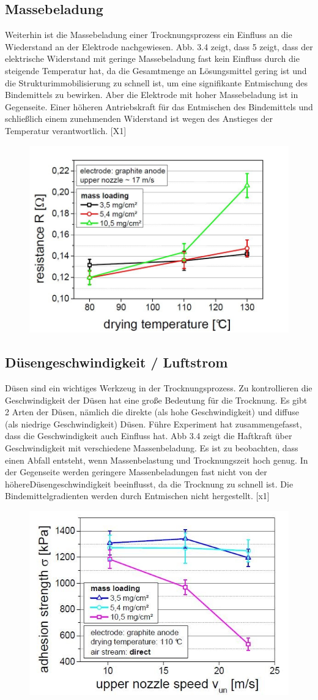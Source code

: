 \documentclass[12pt,UTF8]{article}
\begin{document}
\subsection{Massebeladung}
Weiterhin ist die Massebeladung einer Trocknungsprozess ein Einfluss an die Wiederstand an der Elektrode nachgewiesen. Abb. 3.4 zeigt, dass 5 zeigt, dass der elektrische Widerstand mit geringe Massebeladung fast kein Einfluss durch die steigende Temperatur hat, da die Gesamtmenge an Lösungsmittel gering ist und die Strukturimmobilisierung zu schnell ist, um eine signifikante Entmischung des Bindemittels zu bewirken. Aber die Elektrode mit hoher Massebeladung ist in Gegenseite. Einer höheren Antriebskraft für das Entmischen des Bindemittels und schließlich einem zunehmenden Widerstand ist wegen des Anstieges der Temperatur verantwortlich. [X1]
\begin{figure}[H]
    \centering
    \includegraphics[width=.5\linewidth]{Diagramme/fig3_2_3.jpg}
    \caption{}
\end{figure}

\subsection{D\"usengeschwindigkeit / Luftstrom}
Düsen sind ein wichtiges Werkzeug in der Trocknungsprozess. Zu kontrollieren die Geschwindigkeit der Düsen hat eine große Bedeutung für die Trocknung. Es gibt 2 Arten der Düsen, nämlich die direkte (als hohe Geschwindigkeit) und diffuse (als niedrige Geschwindigkeit) Düsen. Führe Experiment hat zusammengefasst, dass die Geschwindigkeit auch Einfluss hat.
Abb 3.4 zeigt die Haftkraft über Geschwindigkeit mit verschiedene Massenbeladung. Es ist zu beobachten, dass einen Abfall entsteht, wenn Massenbelastung und Trocknungszeit hoch genug. In der Gegenseite werden geringere Massenbeladungen fast nicht von der höhere\linebreak Düsengeschwindigkeit beeinflusst, da die Trocknung zu schnell ist. Die Bindemittelgradienten werden durch Entmischen nicht hergestellt. [x1]
\begin{figure}[H]
    \centering
    \includegraphics[width=.5\linewidth]{Diagramme/fig3_2_4.jpg}
    \caption{}
\end{figure}
\end{document}

